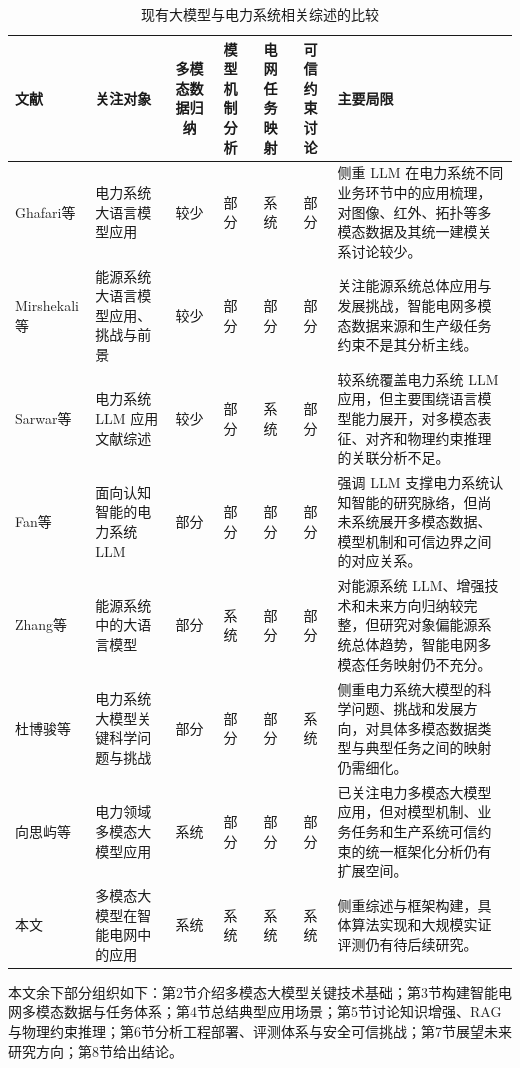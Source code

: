 \documentclass[10.5pt,compsoc]{CjC}
\theoremstyle{mystyle}
\begin{document}
\begin{table}[t]
\centering
\caption{现有大模型与电力系统相关综述的比较}
\label{tab:survey_comparison}
\songti
\setlength{\tabcolsep}{3pt}
\renewcommand{\arraystretch}{1.18}
\begin{tabularx}{\textwidth}{p{} p{} c c c c X}
\toprule
文献 & 关注对象 & 多模态数据归纳 & 模型机制分析 & 电网任务映射 & 可信约束讨论 & 主要局限 \\
\midrule
Ghafari等\cite{ghafari2025comprehensive} & 电力系统大语言模型应用 & 较少 & 部分 & 系统 & 部分 & 侧重 LLM 在电力系统不同业务环节中的应用梳理，对图像、红外、拓扑等多模态数据及其统一建模关系讨论较少。 \\
Mirshekali等\cite{mirshekali2025review} & 能源系统大语言模型应用、挑战与前景 & 较少 & 部分 & 部分 & 部分 & 关注能源系统总体应用与发展挑战，智能电网多模态数据来源和生产级任务约束不是其分析主线。 \\
Sarwar等\cite{sarwar2025large} & 电力系统 LLM 应用文献综述 & 较少 & 部分 & 系统 & 部分 & 较系统覆盖电力系统 LLM 应用，但主要围绕语言模型能力展开，对多模态表征、对齐和物理约束推理的关联分析不足。 \\
Fan等\cite{fan2025cognitive} & 面向认知智能的电力系统 LLM & 部分 & 部分 & 部分 & 部分 & 强调 LLM 支撑电力系统认知智能的研究脉络，但尚未系统展开多模态数据、模型机制和可信边界之间的对应关系。 \\
Zhang等\cite{zhang2026large} & 能源系统中的大语言模型 & 部分 & 系统 & 部分 & 部分 & 对能源系统 LLM、增强技术和未来方向归纳较完整，但研究对象偏能源系统总体趋势，智能电网多模态任务映射仍不充分。 \\
杜博骏等\cite{du2026key} & 电力系统大模型关键科学问题与挑战 & 部分 & 部分 & 部分 & 系统 & 侧重电力系统大模型的科学问题、挑战和发展方向，对具体多模态数据类型与典型任务之间的映射仍需细化。 \\
向思屿等\cite{xiang2025mllm_power} & 电力领域多模态大模型应用 & 系统 & 部分 & 部分 & 部分 & 已关注电力多模态大模型应用，但对模型机制、业务任务和生产系统可信约束的统一框架化分析仍有扩展空间。 \\
本文 & 多模态大模型在智能电网中的应用 & 系统 & 系统 & 系统 & 系统 & 侧重综述与框架构建，具体算法实现和大规模实证评测仍有待后续研究。 \\
\bottomrule
\end{tabularx}
\end{table}

本文余下部分组织如下：第2节介绍多模态大模型关键技术基础；第3节构建智能电网多模态数据与任务体系；第4节总结典型应用场景；第5节讨论知识增强、RAG与物理约束推理；第6节分析工程部署、评测体系与安全可信挑战；第7节展望未来研究方向；第8节给出结论。
\end{document}
